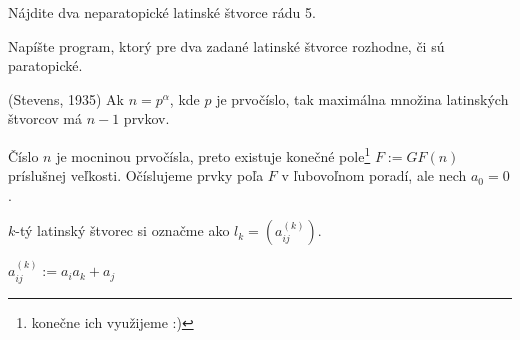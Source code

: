 \begin{exercise}
Nájdite dva neparatopické latinské štvorce rádu 5.
\end{exercise}

\begin{exercise}
Napíšte program, ktorý pre dva zadané latinské štvorce rozhodne, či sú paratopické.
\end{exercise}


\begin{theorem}{(Stevens, 1935)}
\label{thm:stevens}
Ak $n = p^\alpha$, kde $p$ je prvočíslo, tak maximálna množina latinských štvorcov má $n-1$ prvkov.
\end{theorem}

\begin{construction}
Číslo $n$ je mocninou prvočísla, preto existuje konečné pole\footnote{konečne ich využijeme :)} $F := GF(n)$ príslušnej veľkosti. 
Očíslujeme prvky poľa $F$ v ľubovoľnom poradí, ale nech $a_0 = 0$.

$k$-tý latinský štvorec si označme ako $l_k = \left(a_{ij}^{(k)}\right)$.

$a_{ij}^{(k)} := a_i a_k + a_j$
\end{construction}


